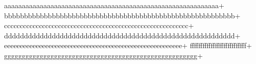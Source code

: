 {aaaaaaaaaaaaaaaaaaaaaaaaaaaaaaaaaaaaaaaaaaaaaaaaaaaaaaaaaaaa}+ {bbbbbbbbbbbbbbbbbbbbbbbbbbbbbbbbbbbbbbbbbbbbbbbbbbbbbbbbbb}+ {cccccccccccccccccccccccccccccccccccccccccccccccccccccccccc}+ {dddddddddddddddddddddddddddddddddddddddddddddddddddddddddd}+ {eeeeeeeeeeeeeeeeeeeeeeeeeeeeeeeeeeeeeeeeeeeeeeeeeeeeeeee}+ {fffffffffffffffffffffffffff}+ {gggggggggggggggggggggggggggggggggggggggggggggggggggggg}+